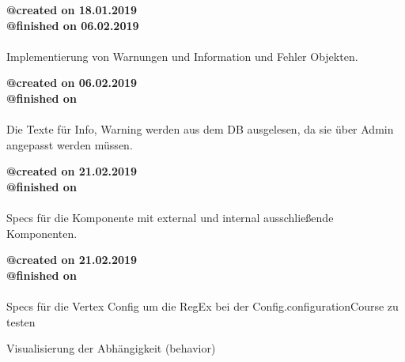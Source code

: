\documentclass{article}
\begin{document}
\noindent \textbf{@created on 18.01.2019}\\
\textbf{@finished on 06.02.2019}\\\\

Implementierung von Warnungen und Information und Fehler Objekten.

\noindent \textbf{@created on 06.02.2019}\\
\textbf{@finished on}\\\\
Die Texte für Info, Warning werden aus dem DB ausgelesen, da sie über Admin angepasst werden müssen.


\noindent \textbf{@created on 21.02.2019}\\
\textbf{@finished on}\\\\
Specs für die Komponente mit external und internal ausschließende Komponenten.

\noindent \textbf{@created on 21.02.2019}\\
\textbf{@finished on}\\\\
Specs für die Vertex Config um die RegEx bei der Config.configurationCourse zu testen



Visualisierung der Abhängigkeit (behavior)
\end{document}
